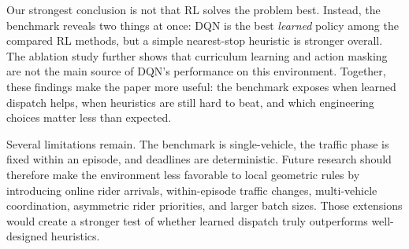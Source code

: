\documentclass{article}
\begin{document}
Our strongest conclusion is not that RL solves the problem best. Instead, the benchmark reveals two things at once: DQN is the best \emph{learned} policy among the compared RL methods, but a simple nearest-stop heuristic is stronger overall. The ablation study further shows that curriculum learning and action masking are not the main source of DQN's performance on this environment. Together, these findings make the paper more useful: the benchmark exposes when learned dispatch helps, when heuristics are still hard to beat, and which engineering choices matter less than expected.

Several limitations remain. The benchmark is single-vehicle, the traffic phase is fixed within an episode, and deadlines are deterministic. Future research should therefore make the environment less favorable to local geometric rules by introducing online rider arrivals, within-episode traffic changes, multi-vehicle coordination, asymmetric rider priorities, and larger batch sizes. Those extensions would create a stronger test of whether learned dispatch truly outperforms well-designed heuristics.



\end{document}

